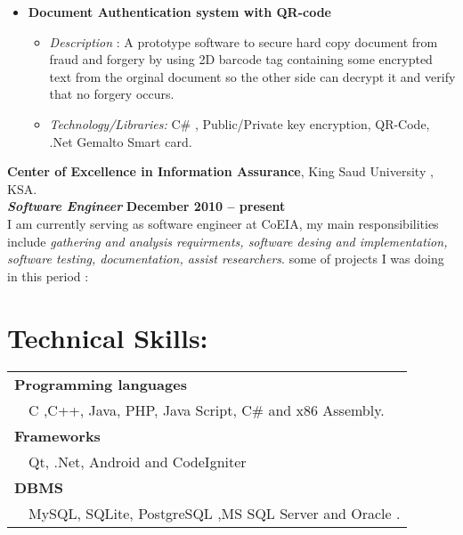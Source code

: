 \documentclass[margin,line,a4paper]{resume}
\begin{document}
\begin{resume}
\begin{itemize}
\item \textbf{Document Authentication system with QR-code}
\begin{itemize}
\item  \textsl{Description} : A prototype software to secure hard copy document from fraud and forgery by using 2D barcode tag containing some encrypted text from the orginal document so the other side can decrypt it and verify that no forgery occurs.

\item  \textsl{Technology/Libraries:} C\# , Public/Private key encryption, QR-Code, .Net Gemalto Smart card.
\end{itemize}

\end{itemize}

    \textbf{Center of Excellence in Information Assurance}, King Saud University , KSA. \vspace{2mm}\\\vspace{1mm}%
    \textsl{\textbf{Software Engineer}} \hfill \textbf{December 2010 -- present}\\
     I am currently serving as software engineer at CoEIA, my main responsibilities include \textsl{gathering and analysis requirments, software desing and implementation, software testing, documentation, assist researchers}. some of projects I was doing in this period :

    \section{\mysidestyle Technical Skills: } 

\begin{tabular}{ l  l }

\multicolumn{2}{l}{\textbf{Programming languages}} \\
& C ,C++, Java, PHP, Java Script, C\# and x86 Assembly. \\

\multicolumn{2}{l}{\textbf{Frameworks}} \\
& Qt, .Net, Android and CodeIgniter \\

\multicolumn{2}{l}{\textbf{DBMS}} \\
& MySQL, SQLite, PostgreSQL ,MS SQL Server and Oracle .\\
 

\end{tabular}
\end{resume}
\end{document}
